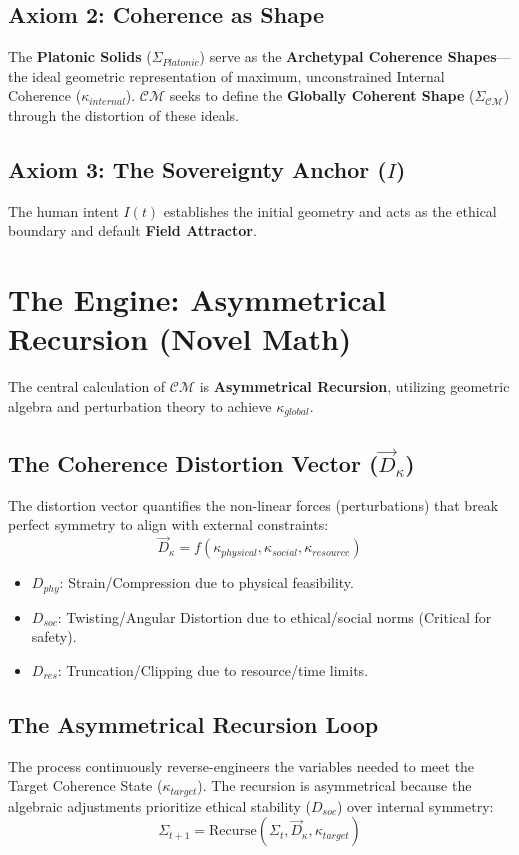 \documentclass{article}
\begin{document}
\subsection{Axiom 2: Coherence as Shape}
The \textbf{Platonic Solids} ($\Sigma_{Platonic}$) serve as the \textbf{Archetypal Coherence Shapes}—the ideal geometric representation of maximum, unconstrained Internal Coherence ($\kappa_{internal}$). $\mathcal{C}\mathcal{M}$ seeks to define the \textbf{Globally Coherent Shape} ($\Sigma_{\mathcal{C}\mathcal{M}}$) through the distortion of these ideals.

\subsection{Axiom 3: The Sovereignty Anchor ($I$)}
The human intent $I(t)$ establishes the initial geometry and acts as the ethical boundary and default \textbf{Field Attractor}.

\section{The Engine: Asymmetrical Recursion (Novel Math)}

The central calculation of $\mathcal{C}\mathcal{M}$ is \textbf{Asymmetrical Recursion}, utilizing geometric algebra and perturbation theory to achieve $\kappa_{global}$.

\subsection{The Coherence Distortion Vector ($\vec{D}_{\kappa}$)}
The distortion vector quantifies the non-linear forces (perturbations) that break perfect symmetry to align with external constraints:
$$
\vec{D}_{\kappa} = f(\kappa_{physical}, \kappa_{social}, \kappa_{resource})
$$

\begin{itemize}
    \item $D_{phy}$: Strain/Compression due to physical feasibility.
    \item $D_{soc}$: Twisting/Angular Distortion due to ethical/social norms (Critical for safety).
    \item $D_{res}$: Truncation/Clipping due to resource/time limits.
\end{itemize}

\subsection{The Asymmetrical Recursion Loop}
The process continuously reverse-engineers the variables needed to meet the Target Coherence State ($\kappa_{target}$). The recursion is asymmetrical because the algebraic adjustments prioritize ethical stability ($D_{soc}$) over internal symmetry:
$$
\Sigma_{t+1} = \text{Recurse}(\Sigma_{t}, \vec{D}_{\kappa}, \kappa_{target})
$$
\end{document}
